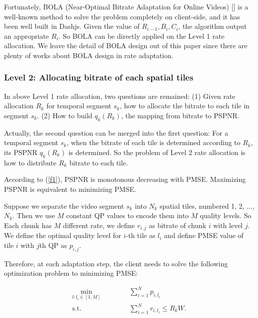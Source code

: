 Fortunately, BOLA (Near-Optimal Bitrate Adaptation for Online Videos) [] is a well-known method to solve the problem completely on client-side, and it has been well built in Dashjs. Given the value of $R_{i-1}, B_i, C_i$, the algorithm output an appropriate $R_i$. So BOLA can be directly applied on the Level 1 rate allocation. We leave the detail of BOLA design out of this paper since there are plenty of works about BOLA design in rate adaptation.

\subsubsection{Level 2: Allocating bitrate of each spatial tiles}

In above Level 1 rate allocation, two questions are remained: (1) Given rate allocation $R_k$ for temporal segment $s_k$, how to allocate the bitrate to each tile in segment $s_k$. (2) How to build $q_k(R_k)$, the mapping from bitrate to PSPNR. 

Actually, the second question can be merged into the first question: For a temporal segment $s_k$, when the bitrate of each tile is determined according to $R_k$, its PSPNR $q_k(R_k)$ is determined. So the problem of Level 2 rate allocation is how to distribute $R_k$ bitrate to each tile.

According to (\ref{f1}), PSPNR is monotonous decreasing with PMSE. Maximizing PSPNR is equivalent to minimizing PMSE.

Suppose we separate the video segment $s_k$ into $N_k$ spatial tiles, numbered 1, 2, ..., $N_k$. Then we use $M$ constant QP values to encode them into $M$ quality levels. So Each chunk has $M$ different rate, we define $r_{i, j}$ as bitrate of chunk $i$ with level $j$. We define the optimal quality level for $i$-th tile as $l_i$ and define PMSE value of tile $i$ with $j$th QP as $p_{i, j}$.

Therefore, at each adaptation step, the client needs to solve the following optimization problem to minimizing PMSE:

\begin{equation}
\begin{aligned}
\min_{l: l_i \in [1, M]} \text{~~~~~~} & \text{~~~~} \sum_{i = 1}^N p_{i, l_i} \\
\text{s.t.} \text{~~~~} & \text{~~~~}\sum_{i=1}^N r_{i,l_i} \le R_kW.
\end{aligned}
\end{equation}

